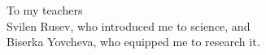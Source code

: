 \thispagestyle{empty}
{}

\vspace*{3cm}

\begin{center}
    To my teachers \\[2pt]
    Svilen Rusev, who introduced me to science, and \\ %
    Biserka Yovcheva, who equipped me to research it.



\end{center}

\medskip
